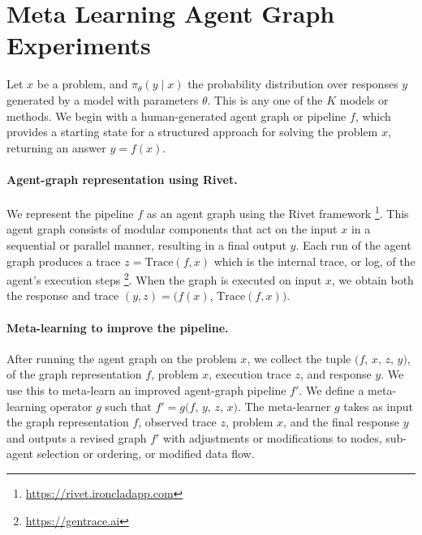 \section{Meta Learning Agent Graph Experiments}
\label{appendix:W}

Let $x$ be a problem, and \(\pi_{\theta}(y \mid x)\) the probability distribution over responses \(y\) generated by a model with parameters \(\theta\). This is any one of the $K$ models or methods. 
We begin with a human-generated agent graph or pipeline $f$, which provides a starting state for a structured approach for solving the problem $x$, returning an answer $y = f(x)$. 

\paragraph{Agent-graph representation using Rivet.}
We represent the pipeline $f$ as an agent graph using the Rivet framework \footnote{\url{https://rivet.ironcladapp.com}}. This agent graph consists of modular components that act on the input $x$ in a sequential or parallel manner, resulting in a final output $y$. Each run of the agent graph produces a trace $z = \text{Trace}(f, x)$ which is the internal trace, or log, of the agent's execution steps \footnote{\url{https://gentrace.ai}}. When the graph is executed on input $x$, we obtain both the response and trace $(y,z)=\bigl(f(x),\,\text{Trace}(f, x)\bigr)$.

\paragraph{Meta-learning to improve the pipeline.}
After running the agent graph on the problem $x$, we collect the tuple 
$\bigl(f,\,x,\,z,\,y\bigr)$, of the graph representation $f$, problem $x$, execution trace $z$, and response $y$. We use this to meta-learn an improved agent-graph pipeline $f'$. We define a meta-learning operator $g$ such that $f' = g\bigl(f,\,y,\,z,\,x\bigr)$. The meta-learner $g$ takes as input the graph representation $f$, observed trace $z$, problem $x$, and the final response $y$ and outputs a revised graph $f'$ with adjustments or modifications to nodes, sub-agent selection or ordering, or modified data flow.

